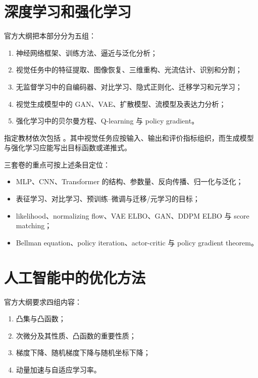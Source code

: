 \MLTextbooks

\section{深度学习和强化学习}

官方大纲把本部分分为五组：

\begin{enumerate}
  \item 神经网络框架、训练方法、逼近与泛化分析；
  \item 视觉任务中的特征提取、图像恢复、三维重构、光流估计、识别和分割；
  \item 无监督学习中的自编码器、对比学习、隐式正则化、迁移学习和元学习；
  \item 视觉生成模型中的 GAN、VAE、扩散模型、流模型及表达力分析；
  \item 强化学习中的贝尔曼方程、Q-learning 与 policy gradient。
\end{enumerate}

指定教材依次包括 \textcite{goodfellow2016deep,bishop2023deep,bishop2006prml,szeliski2022vision}。其中视觉任务应按输入、输出和评价指标组织，而生成模型与强化学习应能写出目标函数或递推式。

三套卷的重点可按上述条目定位：

\begin{itemize}
  \item MLP、CNN、Transformer 的结构、参数量、反向传播、归一化与泛化；
  \item 表征学习、对比学习、预训练--微调与迁移/元学习的目标；
  \item likelihood、normalizing flow、VAE ELBO、GAN、DDPM ELBO 与 score matching；
  \item Bellman equation、policy iteration、actor-critic 与 policy gradient theorem。
\end{itemize}

\DeepTextbooks

\section{人工智能中的优化方法}

官方大纲要求四组内容：

\begin{enumerate}
  \item 凸集与凸函数；
  \item 次微分及其性质、凸函数的重要性质；
  \item 梯度下降、随机梯度下降与随机坐标下降；
  \item 动量加速与自适应学习率。
\end{enumerate}

